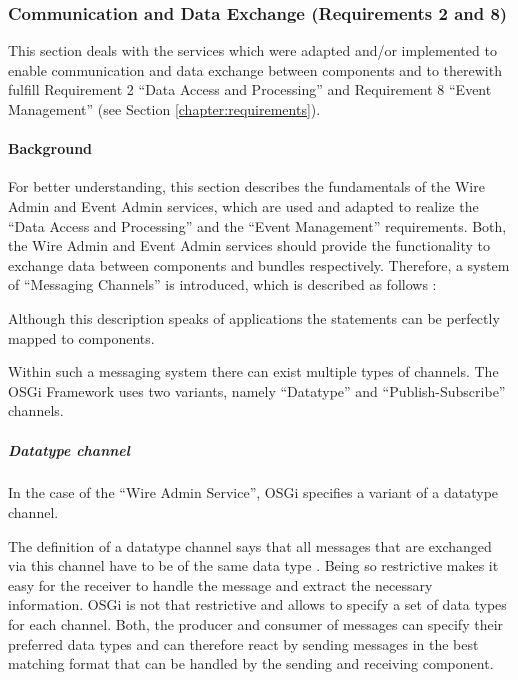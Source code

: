 \subsubsection{Communication and Data Exchange (Requirements 2 and 8)}
\label{sec:communication}
This section deals with the services which were adapted and/or implemented to enable communication
and data exchange between components and to therewith fulfill Requirement 2 ``Data Access and
Processing'' and Requirement 8 ``Event Management'' (see Section \ref{chapter:requirements}).

\paragraph{Background}
For better understanding, this section describes the fundamentals of the Wire Admin and Event Admin
services, which are used and adapted to realize the ``Data Access and Processing'' and the ``Event
Management'' requirements.
Both, the Wire Admin and Event Admin services should provide the functionality to exchange data
between components and bundles respectively. Therefore, a system of ``Messaging
Channels'' is introduced, which is described as follows \cite{Hohpe2003}:


Although this description speaks of applications the statements can be
perfectly mapped to components.

Within such a messaging system there can exist multiple types of channels.
The OSGi Framework uses two variants, namely ``Datatype'' and
``Publish-Subscribe'' channels.

\subparagraph{Datatype channel}
In the case of the ``Wire Admin Service'', OSGi specifies a variant of a datatype
channel.

The definition of a datatype channel says that all messages that are exchanged
via this channel have to be of the same data type \cite{Hohpe2003}. Being so restrictive makes
it easy for the receiver to handle the message and extract the necessary information. OSGi
is not that restrictive and allows to specify a set of data types for each channel.
Both, the producer and consumer of messages can specify their preferred data types
and can therefore react by sending messages in the best matching format that can
be handled by the sending and receiving component.

